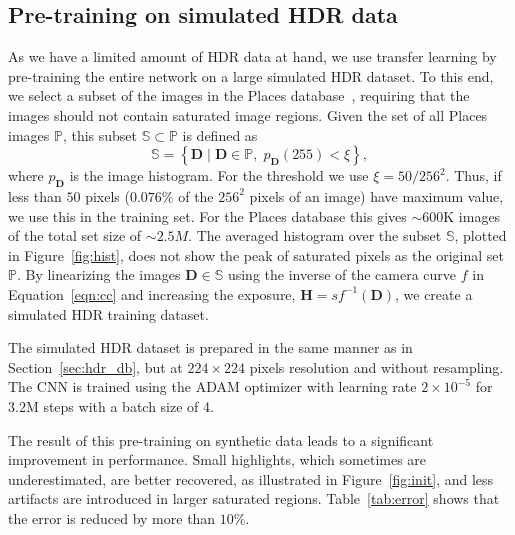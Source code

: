 \documentclass[acmtog]{acmart}
\newcommand{\figref}[1]{Figure~\ref{fig:#1}}
\newcommand{\tabref}[1]{Table~\ref{tab:#1}}
\newcommand{\eqnref}[1]{Equation~\ref{eqn:#1}}
\newcommand{\secref}[1]{Section~\ref{sec:#1}}
\newcommand{\vect}[1]{\boldsymbol{#1}}
\newcommand{\hdrp}{H}
\newcommand{\ldrp}{D}
\newcommand{\hdr}{\vect{\hdrp}}
\newcommand{\ldr}{\vect{\ldrp}}
\newcommand{\cc}{f}
\begin{document}
\subsection{Pre-training on simulated HDR data}\label{sec:pretrain}
As we have a limited amount of HDR data at hand, we use transfer learning by pre-training the entire network on a large simulated HDR dataset. To this end, we select a subset of the images in the Places database~\cite{Zhou2014}, requiring that the images should not contain saturated image regions. Given the set of all Places images $\mathbb{P}$, this subset $\mathbb{S} \subset \mathbb{P} $ is defined as
\begin{equation}
\mathbb{S} = \left\lbrace \ldr \; | \; \ldr \in \mathbb{P}, \; p_{\ldr}(255) < \xi \right\rbrace,
\end{equation}
where $p_{\ldr}$ is the image histogram. For the threshold we use $\xi = 50/256^2$. Thus, if less than $50$ pixels ($0.076\%$ of the $256^2$ pixels of an image) have maximum value, we use this in the training set. For the Places database this gives $\sim\!\!600$K images of the total set size of $\sim\!\!2.5M$. The averaged histogram over the subset $\mathbb{S}$, plotted in \figref{hist}, does not show the peak of saturated pixels as the original set $\mathbb{P}$. By linearizing the images $\ldr \in \mathbb{S}$ using the inverse of the camera curve $\cc$ in \eqnref{cc} and increasing the exposure, $\hdr = s \cc^{-1}(\ldr)$, we create a simulated HDR training dataset.

The simulated HDR dataset is prepared in the same manner as in \secref{hdr_db}, but at $224 \times 224$ pixels resolution and without resampling.
The CNN is trained using the ADAM optimizer with learning rate $2\times 10^{-5}$ for $3.2$M steps with a batch size of 4.

The result of this pre-training on synthetic data leads to a significant improvement in performance. Small highlights, which sometimes are underestimated, are better recovered, as illustrated in \figref{init}, and less artifacts are introduced in larger saturated regions. \tabref{error} shows that the error is reduced by more than $10\%$.
 
\end{document}
